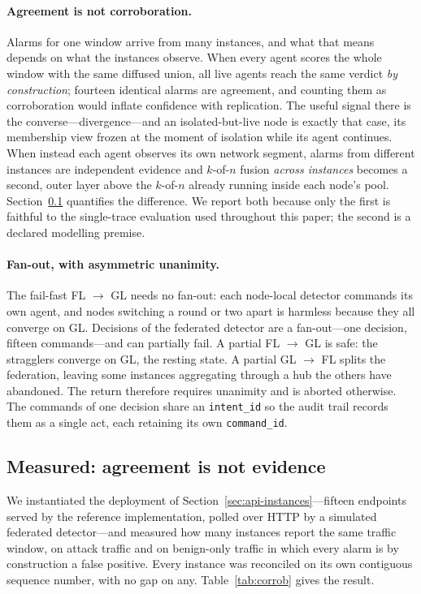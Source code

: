 \paragraph{Agreement is not corroboration.} Alarms for one window arrive from many
instances, and what that means depends on what the instances observe. When every agent
scores the whole window with the same diffused union, all live agents reach the same
verdict \emph{by construction}; fourteen identical alarms are agreement, and counting them
as corroboration would inflate confidence with replication. The useful signal there is the
converse---divergence---and an isolated-but-live node is exactly that case, its membership
view frozen at the moment of isolation while its agent continues. When instead each agent
observes its own network segment, alarms from different instances are independent evidence and
$k$-of-$n$ fusion \emph{across instances} becomes a second, outer layer above the
$k$-of-$n$ already running inside each node's pool. Section~\ref{sec:api-corrob} quantifies
the difference. We report both because only the first is faithful to the single-trace
evaluation used throughout this paper; the second is a declared modelling premise.

\paragraph{Fan-out, with asymmetric unanimity.} The fail-fast FL $\rightarrow$ GL needs no
fan-out: each node-local detector commands its own agent, and nodes switching a round or two
apart is harmless because they all converge on GL. Decisions of the federated detector are a
fan-out---one decision, fifteen commands---and can partially fail. A partial
FL $\rightarrow$ GL is safe: the stragglers converge on GL, the resting state. A partial
GL $\rightarrow$ FL splits the federation, leaving some instances aggregating through a hub
the others have abandoned. The return therefore requires unanimity and is aborted otherwise.
The commands of one decision share an \texttt{intent\_id} so the audit trail records them as
a single act, each retaining its own \texttt{command\_id}.

\subsection{Measured: agreement is not evidence}
\label{sec:api-corrob}

We instantiated the deployment of Section~\ref{sec:api-instances}---fifteen endpoints served
by the reference implementation, polled over HTTP by a simulated federated detector---and
measured how many instances report the same traffic window, on attack traffic and on
benign-only traffic in which every alarm is by construction a false positive. Every instance
was reconciled on its own contiguous sequence number, with no gap on any.
Table~\ref{tab:corrob} gives the result.

